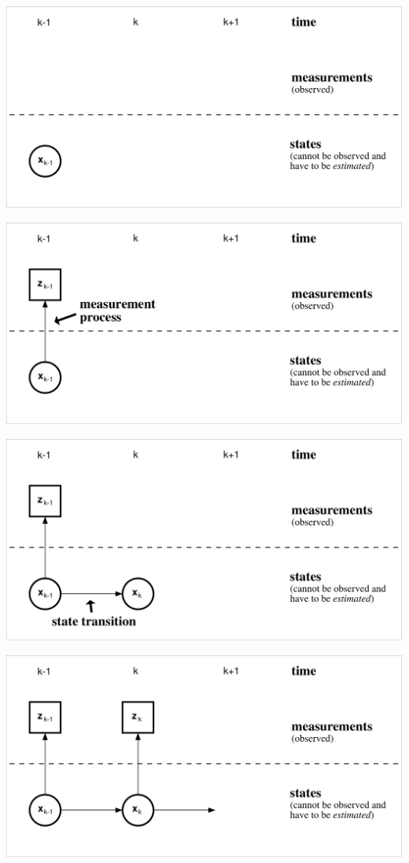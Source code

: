 \documentclass[english,pdftex]{article}
\begin{document}
\newpage
{}
\includegraphics[width=.99\textwidth]{BucSystem1}


\newpage
\includegraphics[width=.99\textwidth]{BucSystem2}


\newpage
\includegraphics[width=.99\textwidth]{BucSystem3}


\newpage
\includegraphics[width=.99\textwidth]{BucSystem4}
\end{document}
